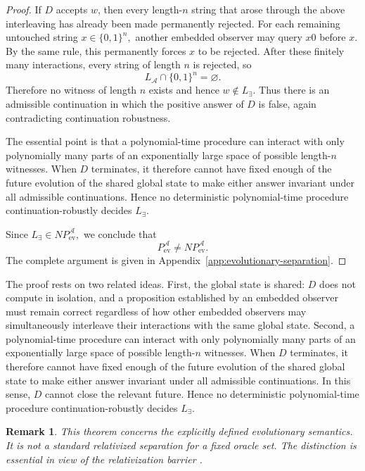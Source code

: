 \documentclass[11pt]{article}
\newtheorem{remark}[definition]{Remark}
\newcommand{\Aev}{\mathcal A}
\begin{document}
\begin{proof}
 If \(D\) accepts \(w\), then every length-\(n\) string that arose through the above interleaving has already been made permanently rejected. For each remaining untouched string \( x\in\{0,1\}^n, \) another embedded observer may query \(x0\) before \(x\). By the same rule, this permanently forces \(x\) to be rejected. After these finitely many   interactions, every string of length \(n\) is rejected, so \[ L_{\Aev}\cap\{0,1\}^n=\varnothing. \] Therefore no witness of length \(n\) exists and hence \( w\notin L_{\exists}. \) 
 Thus there is an admissible continuation in which the positive answer of \(D\) is false, again contradicting continuation robustness.
 
 The essential point is that a polynomial-time procedure can interact with only polynomially many parts of an exponentially large space of possible length-\(n\) witnesses. When \(D\) terminates, it therefore cannot have fixed enough of the future evolution of the shared global state to make either answer invariant under all admissible continuations. Hence no deterministic polynomial-time procedure continuation-robustly decides \(L_{\exists}\). 
 
 Since \( L_{\exists}\in NP^{\Aev}_{\mathrm{ev}}, \) we conclude that \[ P^{\Aev}_{\mathrm{ev}} \neq NP^{\Aev}_{\mathrm{ev}}. \]
The complete argument is given in Appendix~\ref{app:evolutionary-separation}.
\end{proof}

 
The proof rests on two related ideas. First, the global state is shared:
\(D\) does not compute in isolation, and a proposition established by an
embedded observer must remain correct regardless of how other embedded
observers may simultaneously interleave their interactions with the same global
state. Second,   a polynomial-time procedure can
interact with only polynomially many parts of an exponentially large space
of possible length-\(n\) witnesses. When \(D\) terminates, it therefore
cannot have fixed enough of the future evolution of the shared global state
to make either answer invariant under all admissible continuations. In this
sense, \(D\) cannot close the relevant future. Hence no deterministic
polynomial-time procedure continuation-robustly decides \(L_{\exists}\).
 


\begin{remark}
This theorem concerns the explicitly defined evolutionary semantics.  It is not a standard
relativized separation for a fixed oracle set.  The distinction is essential in view of the
relativization barrier \cite{BakerGillSolovay1975}.
\end{remark}
\end{document}
